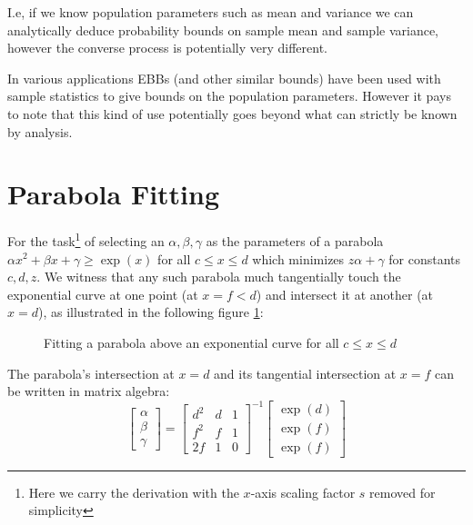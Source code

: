 \documentclass[aap,preprint]{imsart}
\begin{document}
I.e, if we know population parameters such as mean and variance we can analytically deduce probability bounds on sample mean and sample variance, however the converse process is potentially very different.

In various applications EBBs (and other similar bounds) have been used with sample statistics to give bounds on the population parameters. However it pays to note that this kind of use potentially goes beyond what can strictly be known by analysis.



\appendix

\section{Parabola Fitting}\label{appendix1}
For the task\footnote{Here we carry the derivation with the $x$-axis scaling factor $s$ removed for simplicity} of selecting an $\alpha,\beta,\gamma$ as the parameters of a parabola $\alpha x^2+\beta x+\gamma\ge \exp(x)$ for all $c\le x\le d$ which minimizes $z\alpha+\gamma$ for constants $c,d,z$.
We witness that any such parabola much tangentially touch the exponential curve at one point (at $x=f<d$) and intersect it at another (at $x=d$), as illustrated in the following figure \ref{fig:graph1}:
\begin{figure}[h]
\caption{\footnotesize Fitting a parabola above an exponential curve for all $c\le x\le d$}
\label{fig:graph1}
\end{figure}
The parabola's intersection at $x=d$ and its tangential intersection at $x=f$ can be written in matrix algebra:
$$
\begin{bmatrix}
    \alpha \\
    \beta \\
	\gamma
\end{bmatrix}
=
\begin{bmatrix}
    d^2 & d & 1 \\
    f^2 & f & 1 \\
	2f  & 1 & 0
\end{bmatrix}^{-1}
\begin{bmatrix}
    \exp(d) \\
    \exp(f) \\
	\exp(f)
\end{bmatrix}$$
\end{document}
